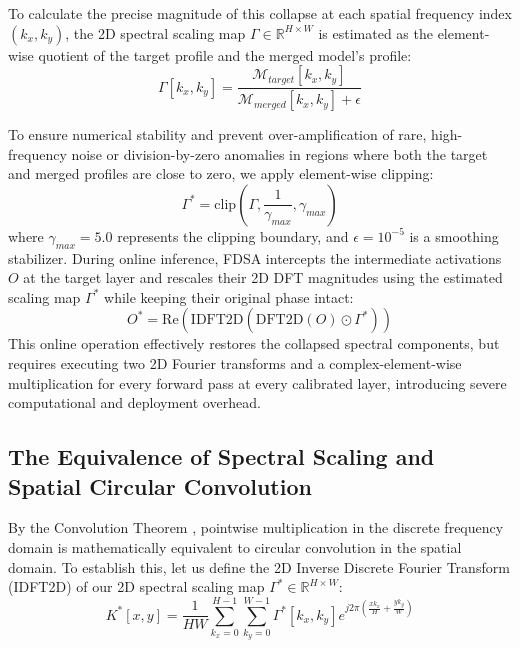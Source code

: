 \documentclass{article}
\theoremstyle{plain}
\theoremstyle{definition}
\theoremstyle{remark}
\begin{document}
To calculate the precise magnitude of this collapse at each spatial frequency index $(k_x, k_y)$, the 2D spectral scaling map $\Gamma \in \mathbb{R}^{H \times W}$ is estimated as the element-wise quotient of the target profile and the merged model's profile:
\begin{equation}
    \Gamma[k_x, k_y] = \frac{\mathcal{M}_{target}[k_x, k_y]}{\mathcal{M}_{merged}[k_x, k_y] + \epsilon}
\end{equation}

To ensure numerical stability and prevent over-amplification of rare, high-frequency noise or division-by-zero anomalies in regions where both the target and merged profiles are close to zero, we apply element-wise clipping:
\begin{equation}
    \Gamma^* = \text{clip}\left(\Gamma, \frac{1}{\gamma_{max}}, \gamma_{max}\right)
\end{equation}
where $\gamma_{max} = 5.0$ represents the clipping boundary, and $\epsilon = 10^{-5}$ is a smoothing stabilizer. During online inference, FDSA intercepts the intermediate activations $O$ at the target layer and rescales their 2D DFT magnitudes using the estimated scaling map $\Gamma^*$ while keeping their original phase intact:
\begin{equation}
    O^* = \text{Re}\left(\text{IDFT2D}\left(\text{DFT2D}(O) \odot \Gamma^*\right)\right)
\end{equation}
This online operation effectively restores the collapsed spectral components, but requires executing two 2D Fourier transforms and a complex-element-wise multiplication for every forward pass at every calibrated layer, introducing severe computational and deployment overhead.

\subsection{The Equivalence of Spectral Scaling and Spatial Circular Convolution}
By the Convolution Theorem \cite{oppenheim1999discrete, pratt2007digital}, pointwise multiplication in the discrete frequency domain is mathematically equivalent to circular convolution in the spatial domain. To establish this, let us define the 2D Inverse Discrete Fourier Transform (IDFT2D) of our 2D spectral scaling map $\Gamma^* \in \mathbb{R}^{H \times W}$:
\begin{equation}
    K^*[x, y] = \frac{1}{H W} \sum_{k_x=0}^{H-1} \sum_{k_y=0}^{W-1} \Gamma^*[k_x, k_y] e^{j 2 \pi \left( \frac{x k_x}{H} + \frac{y k_y}{W} \right)}
\end{equation}
\end{document}
